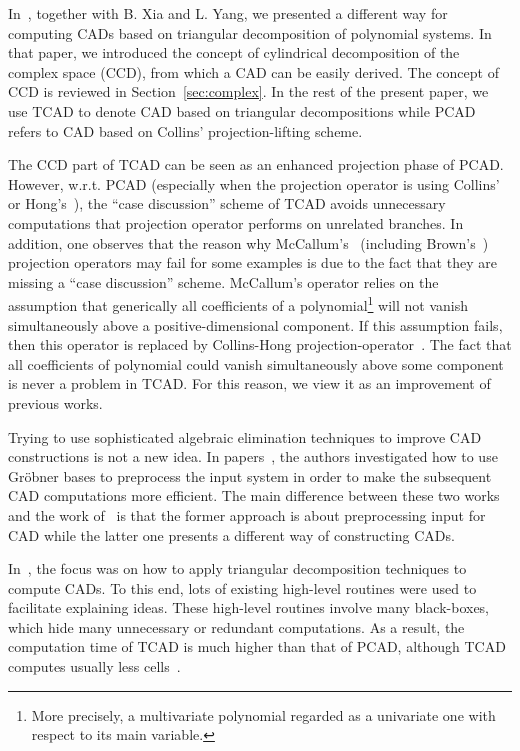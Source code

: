 \documentclass[10pt]{article}
\newcommand{\CCAD}{{PCAD}}
\newcommand{\TCAD}{{\sc TCAD}}
\begin{document}
In~\cite{CMXY09}, together with B. Xia and L. Yang,
we presented a different way for computing CADs 
based on triangular decomposition of polynomial systems.
In that paper, we introduced the concept of 
cylindrical decomposition of the complex space (CCD),  
from which a CAD can be easily derived.
The concept of CCD is reviewed in Section~\ref{sec:complex}.
In the rest of the present paper, we use {\TCAD}
to denote CAD based on triangular decompositions
while {\CCAD} refers to CAD based on Collins' projection-lifting scheme.

The CCD part of {\TCAD} can be seen as an enhanced 
projection phase of {\CCAD}. 
However, w.r.t. {\CCAD} (especially when the projection operator 
is using Collins'~\cite{col75} or Hong's~\cite{hong90}),
the ``case discussion'' scheme of {\TCAD} avoids unnecessary computations 
that projection operator performs on unrelated branches. 
In addition, one observes that 
the reason why McCallum's~\cite{scott98} 
(including Brown's~\cite{brown01}) projection operators
may fail for some examples is due to the fact that 
they are missing a ``case discussion'' scheme.
McCallum's operator relies on the assumption that generically all coefficients
of a polynomial\footnote{More precisely, a multivariate polynomial
regarded as a univariate one with respect to its main variable.}
will not vanish simultaneously above a positive-dimensional component. 
If this assumption fails, then this operator is replaced by Collins-Hong
projection-operator~\cite{hong90}.
The fact that all coefficients of polynomial could vanish 
simultaneously above some component is never a problem in {\TCAD}.
For this reason, we view it as  an improvement of previous works.

Trying to use sophisticated algebraic elimination techniques to
improve CAD constructions is not a new idea. 
In papers~\cite{BH91, WBD12}, the authors investigated how to 
use Gr{\"o}bner bases to preprocess the input system 
in order to make the subsequent CAD computations more efficient.
The main difference between these two works and the work of~\cite{CMXY09}
is that the former approach is about preprocessing input for CAD while the latter
one  presents a different way of constructing CADs. 


In~\cite{CMXY09}, the focus was on how to apply 
triangular decomposition techniques to compute CADs.
To this end, lots 
of existing high-level routines were used to facilitate
explaining ideas. 
These high-level routines involve many black-boxes, 
which hide many unnecessary or redundant computations. 
As a result, the computation time of {\TCAD} is much higher than that of {\CCAD},
although {\TCAD} computes usually less cells~\cite{Chen11}.
\end{document}
